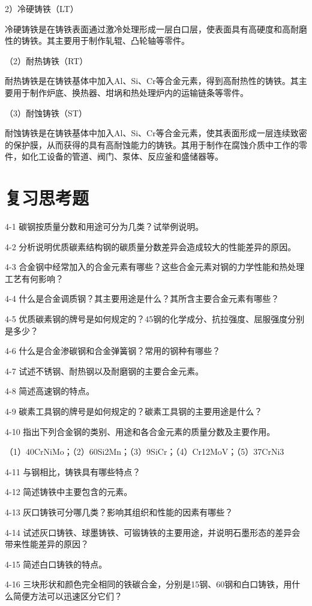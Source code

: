 \documentclass[UTF8]{ctexbook}
\newcommand{\◎}{\ensuremath{\bigcirc}}
\begin{document}
2）冷硬铸铁（LT）

冷硬铸铁是在铸铁表面通过激冷处理形成一层白口层，使表面具有高硬度和高耐磨性的铸铁。其主要用于制作轧辊、凸轮轴等零件。

（2）耐热铸铁（RT）

耐热铸铁是在铸铁基体中加入Al、Si、Cr等合金元素，得到高耐热性的铸铁。其主要用于制作炉底、换热器、坩埚和热处理炉内的运输链条等零件。

（3）耐蚀铸铁（ST）

耐蚀铸铁是在铸铁基体中加入Al、Si、Cr等合金元素，使其表面形成一层连续致密的保护膜，从而获得的具有高耐蚀能力的铸铁。其用于制作在腐蚀介质中工作的零件，如化工设备的管道、阀门、泵体、反应釜和盛储器等。

\section*{复习思考题}

 
4-1 碳钢按质量分数和用途可分为几类？试举例说明。

4-2 分析说明优质碳素结构钢的碳质量分数差异会造成较大的性能差异的原因。

4-3 合金钢中经常加入的合金元素有哪些？这些合金元素对钢的力学性能和热处理工艺有何影响？

4-4 什么是合金调质钢？其主要用途是什么？其所含主要合金元素有哪些？

4-5 优质碳素钢的牌号是如何规定的？45钢的化学成分、抗拉强度、屈服强度分别是多少？

4-6 什么是合金渗碳钢和合金弹簧钢？常用的钢种有哪些？

4-7 试述不锈钢、耐热钢以及耐磨钢的主要合金元素。

4-8 简述高速钢的特点。

4-9 碳素工具钢的牌号是如何规定的？碳素工具钢的主要用途是什么？

4-10 指出下列合金钢的类别、用途和各合金元素的质量分数及主要作用。

（1）40CrNiMo；（2）60Si2Mn；（3）9SiCr；（4）Cr12MoV；（5）37CrNi3

4-11 与钢相比，铸铁具有哪些特点？

4-12 简述铸铁中主要包含的元素。

4-13 灰口铸铁可分哪几类？影响其组织和性能的因素有哪些？

4-14 试述灰口铸铁、球墨铸铁、可锻铸铁的主要用途，并说明石墨形态的差异会带来性能差异的原因？

4-15 简述白口铸铁的特点。

4-16 三块形状和颜色完全相同的铁碳合金，分别是15钢、60钢和白口铸铁，用什么简便方法可以迅速区分它们？
\end{document}
